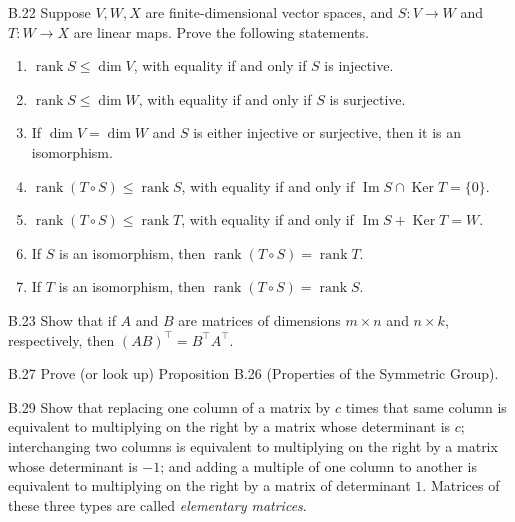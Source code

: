 \begin{exercise}{B.22}
    Suppose \( V, W, X \) are finite-dimensional vector spaces, and \( S : V \to W \) and \( T : W \to X \) are linear maps. Prove the following statements.
    \begin{enumerate}[label={(\alph*)}]
        \item \( \operatorname{rank} S \le \dim V \), with equality if and only if \( S \) is injective.
        \item \( \operatorname{rank} S \le \dim W \), with equality if and only if \( S \) is surjective.
        \item If \( \dim V = \dim W \) and \( S \) is either injective or surjective, then it is an isomorphism.
        \item \( \operatorname{rank}(T \circ S) \le \operatorname{rank} S \), with equality if and only if \( \operatorname{Im} S \cap \operatorname{Ker} T = \{0\} \).
        \item \( \operatorname{rank}(T \circ S) \le \operatorname{rank} T \), with equality if and only if \( \operatorname{Im} S + \operatorname{Ker} T = W \).
        \item If \( S \) is an isomorphism, then \( \operatorname{rank}(T \circ S) = \operatorname{rank} T \).
        \item If \( T \) is an isomorphism, then \( \operatorname{rank}(T \circ S) = \operatorname{rank} S \).
    \end{enumerate}
\end{exercise}

\begin{exercise}{B.23}
    Show that if \( A \) and \( B \) are matrices of dimensions \( m \times n \) and \( n \times k \), respectively, then \( {(AB)}^{\top} = B^{\top} A^{\top} \).
\end{exercise}

\begin{exercise}{B.27}
    Prove (or look up) Proposition B.26 (Properties of the Symmetric Group).
\end{exercise}

\begin{exercise}{B.29}
    Show that replacing one column of a matrix by \( c \) times that same column is equivalent to multiplying on the right by a matrix whose determinant is \( c \); interchanging two columns is equivalent to multiplying on the right by a matrix whose determinant is \( -1 \); and adding a multiple of one column to another is equivalent to multiplying on the right by a matrix of determinant \( 1 \). Matrices of these three types are called \emph{elementary matrices}.
\end{exercise}

